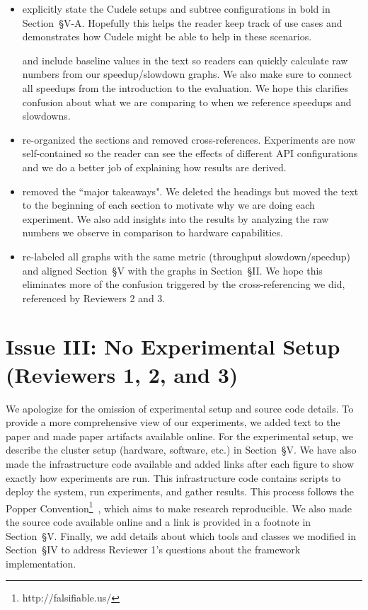 \documentclass[onecolumn,conference]{IEEEtran}
\begin{document}
\begin{itemize}

  \item explicitly state the Cudele setups and subtree configurations in bold
in Section~{\S}V-A. Hopefully this helps the reader keep track of use cases and
demonstrates how Cudele might be able to help in these scenarios. 

and include baseline values in the
text so readers can quickly calculate raw numbers from our speedup/slowdown
graphs. We also make sure to connect all speedups from the introduction to the
evaluation. We hope this clarifies confusion about what we are comparing to
when we reference speedups and slowdowns.

  \item re-organized the sections and removed cross-references. Experiments are
now self-contained so the reader can see the effects of different API
configurations and we do a better job of explaining how results are derived. 

  \item removed the ``major takeaways". We deleted the headings but moved the
text to the beginning of each section to motivate why we are doing each
experiment.  We also add insights into the results by analyzing the raw numbers
we observe in comparison to hardware capabilities.

  \item re-labeled all graphs with the same metric (throughput
slowdown/speedup) and aligned Section~{\S}V with the graphs in Section~{\S}II.
We hope this eliminates more of the confusion triggered by the
cross-referencing we did, referenced by Reviewers 2 and 3.

\end{itemize}

\section*{Issue III: No Experimental Setup (Reviewers 1, 2, and 3)}

We apologize for the omission of experimental setup and source code details. To
provide a more comprehensive view of our experiments, we added text to the
paper and made paper artifacts available online. For the experimental setup, we
describe the cluster setup (hardware, software, etc.) in Section~{\S}V.  We
have also made the infrastructure code available and added links after each
figure to show exactly how experiments are run.  This infrastructure code
contains scripts to deploy the system, run experiments, and gather results.
This process follows the Popper
Convention\footnote{http://falsifiable.us/}~\cite{jimenez_popper_2016}, which
aims to make research reproducible.  We also made the source code available
online and a link is provided in a footnote in Section~{\S}V. Finally, we add
details about which tools and classes we modified in Section~{\S}IV to address
Reviewer 1's questions about the framework implementation.
\end{document}
